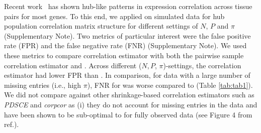 Recent work~\cite{dey2019} has shown hub-like patterns in expression correlation across tissue pairs for most genes. To this end, we applied \Robocov{} on simulated data for hub population correlation matrix structure for different settings of $N$, $P$ and $\pi$ (Supplementary Note). Two metrics of particular interest were the false positive rate (FPR) and the false negative rate (FNR) (Supplementary Note). We used these metrics to compare \Robocov{} correlation estimator with both the pairwise sample correlation estimator and  \CorShrink{}\cite{dey2019}. Across different ($N, P$, $\pi$)-settings, the \Robocov{} correlation estimator had lower FPR than \CorShrink{}. In comparison, for data with a large number of missing entries (i.e., high $\pi$), FNR for \Robocov{} was worse compared to \CorShrink{} (Table \ref{tab:tab1}). We did not compare against other shrinkage-based correlation estimators such as \textit{PDSCE}\cite{rothman2012} and \textit{corpcor}\cite{schafer2004empirical, schafer2005shrinkage} as (i) they do not account for missing entries in the data and have been shown to be sub-optimal to  \CorShrink{} for fully observed data (see Figure 4 from ref.\cite{dey2019}). 



